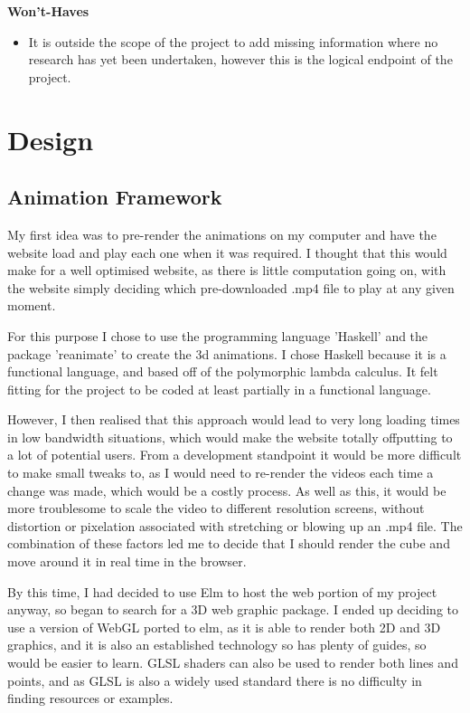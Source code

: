 \documentclass{l4proj}
\begin{document}
\textbf{Won't-Haves}

\begin{itemize}
    \item It is outside the scope of the project to add missing information where no research has yet been undertaken, however this is the logical endpoint of the project.
\end{itemize}


\chapter{Design}

\section{Animation Framework}

My first idea was to pre-render the animations on my computer and have the website load and play each one when it was required.  I thought that this would make for a well optimised website, as there is little computation going on, with the website simply deciding which pre-downloaded .mp4 file to play at any given moment. 

For this purpose I chose to use the programming language 'Haskell' and the package 'reanimate' to create the 3d animations.  I chose Haskell because it is a functional language, and based off of the polymorphic lambda calculus.  It felt fitting for the project to be coded at least partially in a functional language.

However, I then realised that this approach would lead to very long loading times in low bandwidth situations, which would make the website totally offputting to a lot of potential users.  From a development standpoint it would be more difficult to make small tweaks to, as I would need to re-render the videos each time a change was made, which would be a costly process.  As well as this, it would be more troublesome to scale the video to different resolution screens, without distortion or pixelation associated with stretching or blowing up an .mp4 file.  The combination of these factors led me to decide that I should render the cube and move around it in real time in the browser.

By this time, I had decided to use Elm to host the web portion of my project anyway, so began to search for a 3D web graphic package.  I ended up deciding to use a version of WebGL ported to elm, as it is able to render both 2D and 3D graphics, and it is also an established technology so has plenty of guides, so would be easier to learn.  GLSL shaders can also be used to render both lines and points, and as GLSL is also a widely used standard there is no difficulty in finding resources or examples.
\end{document}

